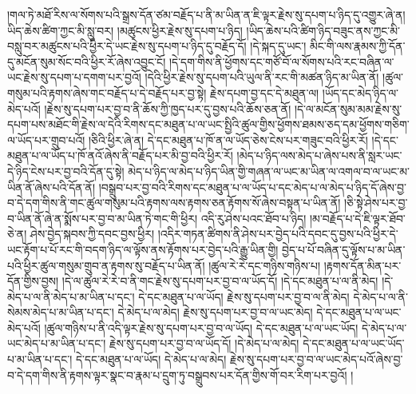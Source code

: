 །གལ་ཏེ་མཐོ་རིས་ལ་སོགས་པའི་སྒྲས་དོན་ཙམ་བརྗོད་པ་ནི་མ་ཡིན་ན་ཇི་ལྟར་རྗེས་སུ་དཔག་པ་ཉིད་དུ་འགྱུར་ཞེ་ན། ཡིད་ཆེས་ཚིག་ཀྱང་མི་སླུ་བར། །མཚུངས་ཕྱིར་རྗེས་སུ་དཔག་པ་ཉིད། །ཡིད་ཆེས་པའི་ཚིག་ཉིད་བཟུང་ནས་ཀྱང་མི་བསླུ་བར་མཚུངས་པའི་ཕྱིར་དེ་ཡང་རྗེས་སུ་དཔག་པ་ཉིད་དུ་བརྗོད་དོ། །དེ་སྐད་དུ་ཡང་། མིང་གི་ལས་རྣམས་ཀྱི་དོན་དུ་མངོན་སུམ་སོང་བའི་ཕྱིར་རོ་ཞེས་འབྱུང་ངོ། །དེ་དག་གིས་ནི་ཕྱོགས་དང་གཙོ་བོ་ལ་སོགས་པའི་རང་བཞིན་ལ་ཡང་རྗེས་སུ་དཔག་པ་དགག་པར་བྱའོ། །དེའི་ཕྱིར་རྗེས་སུ་དཔག་པའི་ཡུལ་ནི་རང་གི་མཚན་ཉིད་མ་ཡིན་ནོ། །ཚུལ་གསུམ་པའི་རྟགས་ཞེས་གང་བརྗོད་པ་དེ་བརྗོད་པར་བྱ་སྟེ། རྗེས་དཔག་བྱ་དང་དེ་མཐུན་ལ། །ཡོད་དང་མེད་ཉིད་ལ་མེད་པའོ། །རྗེས་སུ་དཔག་པར་བྱ་བ་ནི་ཆོས་ཀྱི་ཁྱད་པར་དུ་བྱས་པའི་ཆོས་ཅན་ནོ། །དེ་ལ་མངོན་སུམ་མམ་རྗེས་སུ་དཔག་པས་མཐོང་གི་རྗེས་ལ་དེའི་རིགས་དང་མཐུན་པ་ལ་ཡང་སྤྱིའི་ཚུལ་གྱིས་ཕྱོགས་ཐམས་ཅད་དམ་ཕྱོགས་གཅིག་ལ་ཡོད་པར་གྲུབ་པའོ། །ཅིའི་ཕྱིར་ཞེ་ན། དེ་དང་མཐུན་པ་ཁོ་ན་ལ་ཡོད་ཅེས་ངེས་པར་གཟུང་བའི་ཕྱིར་རོ། །དེ་དང་མཐུན་པ་ལ་ཡོད་པ་ཁོ་ནའོ་ཞེས་ནི་བརྗོད་པར་མི་བྱ་བའི་ཕྱིར་རོ། །མེད་པ་ཉིད་ལས་མེད་པ་ཞེས་པས་ནི་སླར་ཡང་དེ་ཉིད་ངེས་པར་བྱ་བའི་དོན་དུ་སྟེ། མེད་པ་ཉིད་ལ་མེད་པ་ཉིད་ཡིན་གྱི་གཞན་ལ་ཡང་མ་ཡིན་ལ་འགལ་བ་ལ་ཡང་མ་ཡིན་ནོ་ཞེས་པའི་དོན་ནོ། །བསྒྲུབ་པར་བྱ་བའི་རིགས་དང་མཐུན་པ་ལ་ཡོད་པ་དང་མེད་པ་ལ་མེད་པ་ཉིད་དོ་ཞེས་བྱ་བ་དེ་དག་གིས་ནི་གང་ཚུལ་གསུམ་པའི་རྟགས་ལས་རྟགས་ཅན་རྟོགས་སོ་ཞེས་བསྟན་པ་ཡིན་ནོ། །ཅི་སྟེ་ཤེས་པར་བྱ་བ་ཡིན་ནོ་ཞེ་ན་སྨོས་པར་བྱ་བ་མ་ཡིན་ཏེ་གང་གི་ཕྱིར། འདི་རུ་ཤེས་པའང་ཐོབ་པ་ཉིད། །མ་བརྗོད་པ་དེ་ཇི་ལྟར་ཐོབ་ཅེ་ན། ཤེས་བྱེད་སྐབས་ཀྱི་དབང་བྱས་ཕྱིར། །འདིར་གཏན་ཚིགས་ནི་ཤེས་པར་བྱེད་པའི་དབང་དུ་བྱས་པའི་ཕྱིར་དེ་ཡང་རྟོག་པ་པོ་རང་གི་བདག་ཉིད་ལ་ལྟོས་ནས་རྟོགས་པར་བྱེད་པའི་རྒྱུ་ཡིན་གྱི། བྱེད་པ་པོ་བཞིན་དུ་ལྟོས་པ་མ་ཡིན་པའི་ཕྱིར་ཚུལ་གསུམ་གྲུབ་ན་རྟགས་སུ་བརྗོད་པ་ཡིན་ནོ། །ཚུལ་རེ་རེ་དང་གཉིས་གཉིས་པ། །རྟགས་དོན་མིན་པར་དོན་གྱིས་བྱས། །དེ་ལ་ཚུལ་རེ་རེ་བ་ནི་གང་རྗེས་སུ་དཔག་པར་བྱ་བ་ལ་ཡོད་དོ། །དེ་དང་མཐུན་པ་ལ་ནི་མེད། །དེ་མེད་པ་ལ་ནི་མེད་པ་མ་ཡིན་པ་དང་། དེ་དང་མཐུན་པ་ལ་ཡོད། རྗེས་སུ་དཔག་པར་བྱ་བ་ལ་ནི་མེད། དེ་མེད་པ་ལ་ནི་སེམས་མེད་པ་མ་ཡིན་པ་དང་། དེ་མེད་པ་ལ་མེད། རྗེས་སུ་དཔག་པར་བྱ་བ་ལ་ཡང་མེད། དེ་དང་མཐུན་པ་ལ་ཡང་མེད་པའོ། །ཚུལ་གཉིས་པ་ནི་འདི་ལྟར་རྗེས་སུ་དཔག་པར་བྱ་བ་ལ་ཡོད། དེ་དང་མཐུན་པ་ལ་ཡང་ཡོད། དེ་མེད་པ་ལ་ཡང་མེད་པ་མ་ཡིན་པ་དང་། རྗེས་སུ་དཔག་པར་བྱ་བ་ལ་ཡོད་དོ། །དེ་མེད་པ་ལ་མེད། དེ་དང་མཐུན་པ་ལ་ཡང་ཡོད་པ་མ་ཡིན་པ་དང་། དེ་དང་མཐུན་པ་ལ་ཡོད། དེ་མེད་པ་ལ་མེད། རྗེས་སུ་དཔག་པར་བྱ་བ་ལ་ཡང་མེད་པའོ་ཞེས་བྱ་བ་དེ་དག་གིས་ནི་རྟགས་ལྟར་སྣང་བ་རྣམ་པ་དྲུག་ཏུ་བསྒྲུབས་པར་དོན་གྱིས་གོ་བར་རིག་པར་བྱའོ། །
